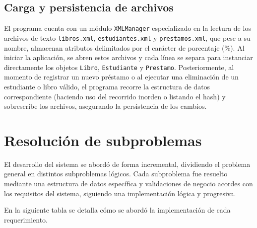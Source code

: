 \documentclass[11pt]{article}
\begin{document}
\subsection{Carga y persistencia de archivos}

El programa cuenta con un módulo \texttt{XMLManager} especializado en la lectura de los archivos de texto \texttt{libros.xml}, \texttt{estudiantes.xml} y \texttt{prestamos.xml}, que pese a su nombre, almacenan atributos delimitados por el carácter de porcentaje (\%). Al iniciar la aplicación, se abren estos archivos y cada línea se separa para instanciar directamente los objetos \texttt{Libro}, \texttt{Estudiante} y \texttt{Prestamo}. Posteriormente, al momento de registrar un nuevo préstamo o al ejecutar una eliminación de un estudiante o libro válido, el programa recorre la estructura de datos correspondiente (haciendo uso del recorrido inorden o listando el hash) y sobrescribe los archivos, asegurando la persistencia de los cambios.

\section{Resolución de subproblemas}

El desarrollo del sistema se abordó de forma incremental, dividiendo el problema general en distintos subproblemas lógicos. Cada subproblema fue resuelto mediante una estructura de datos específica y validaciones de negocio acordes con los requisitos del sistema, siguiendo una implementación lógica y progresiva.

En la siguiente tabla se detalla cómo se abordó la implementación de cada requerimiento.
\end{document}
